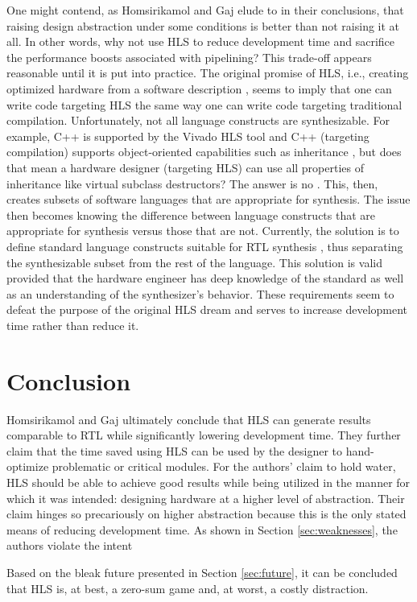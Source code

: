 \documentclass[onecolumn]{article}
\begin{document}
One might contend, as Homsirikamol and Gaj elude to in their conclusions, that raising design abstraction under some conditions is better than not raising it at all. In other words, why not use HLS to reduce development time and sacrifice the performance boosts associated with pipelining? This trade-off appears reasonable until it is put into practice. The original promise of HLS, i.e., creating optimized hardware from a software description \cite{3}, seems to imply that one can write code targeting HLS the same way one can write code targeting traditional compilation. Unfortunately, not all language constructs are synthesizable. For example, C++ is supported by the Vivado HLS tool \cite{vivado} and C++ (targeting compilation) supports object-oriented capabilities such as inheritance \cite{c++datamodel}, but does that mean a hardware designer (targeting HLS) can use all properties of inheritance like virtual subclass destructors? The answer is no \cite{c++hls}. This, then, creates subsets of software languages that are appropriate for synthesis. The issue then becomes knowing the difference between language constructs that are appropriate for synthesis versus those that are not. Currently, the solution is to define standard language constructs suitable for RTL synthesis \cite{ieeeverilog}, thus separating the synthesizable subset from the rest of the language. This solution is valid provided that the hardware engineer has deep knowledge of the standard as well as an understanding of the synthesizer's behavior. These requirements seem to defeat the purpose of the original HLS dream and serves to increase development time rather than reduce it.

\section{Conclusion}
Homsirikamol and Gaj ultimately conclude that HLS can generate results comparable to RTL while significantly lowering development time. They further claim that the time saved using HLS can be used by the designer to hand-optimize problematic or critical modules. For the authors' claim to hold water, HLS should be able to achieve good results while being utilized in the manner for which it was intended: designing hardware at a higher level of abstraction. Their claim hinges so precariously on higher abstraction because this is the only stated means of reducing development time. As shown in Section \ref{sec:weaknesses}, the authors violate the intent 


Based on the bleak future presented in Section \ref{sec:future}, it can be concluded that HLS is, at best, a zero-sum game and, at worst, a costly distraction.



\end{document}
